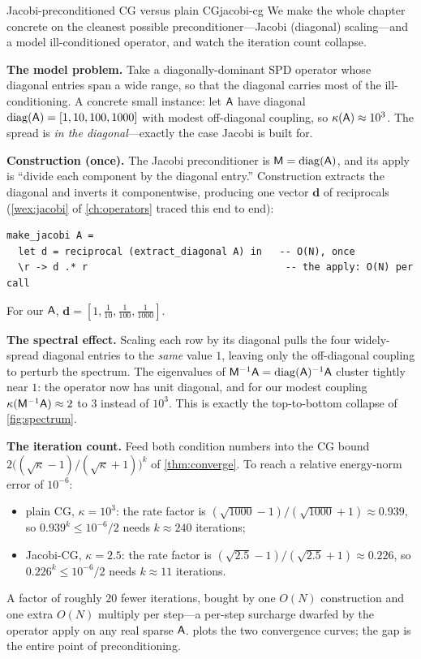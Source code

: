 \begin{workedexample}{Jacobi-preconditioned CG versus plain CG}{jacobi-cg}
We make the whole chapter concrete on the cleanest possible preconditioner---Jacobi
(diagonal) scaling---and a model ill-conditioned operator, and watch the iteration count
collapse.

\textbf{The model problem.} Take a diagonally-dominant SPD operator whose diagonal entries
span a wide range, so that the diagonal carries most of the ill-conditioning. A concrete
small instance: let $\mathsf{A}$ have diagonal $\operatorname{diag}(\mathsf{A})=[1,10,100,1000]$
with modest off-diagonal coupling, so $\kappa(\mathsf{A})\approx 10^{3}$. The spread is
\emph{in the diagonal}---exactly the case Jacobi is built for.

\textbf{Construction (once).} The Jacobi preconditioner is $\mathsf{M}=\operatorname{diag}(\mathsf{A})$,
and its apply is ``divide each component by the diagonal entry.'' Construction extracts the
diagonal and inverts it componentwise, producing one vector $\mathbf{d}$ of reciprocals
(\cref{wex:jacobi} of \cref{ch:operators} traced this end to end):
\begin{lstlisting}[style=l4style]
make_jacobi A =
  let d = reciprocal (extract_diagonal A) in   -- O(N), once
  \r -> d .* r                                  -- the apply: O(N) per call
\end{lstlisting}
For our $\mathsf{A}$, $\mathbf{d}=[1,\tfrac1{10},\tfrac1{100},\tfrac1{1000}]$.

\textbf{The spectral effect.} Scaling each row by its diagonal pulls the four widely-spread
diagonal entries to the \emph{same} value $1$, leaving only the off-diagonal coupling to
perturb the spectrum. The eigenvalues of $\mathsf{M}^{-1}\mathsf{A}=\operatorname{diag}(\mathsf{A})^{-1}\mathsf{A}$
cluster tightly near $1$: the operator now has unit diagonal, and for our modest coupling
$\kappa(\mathsf{M}^{-1}\mathsf{A})\approx 2$ to $3$ instead of $10^3$. This is exactly the
top-to-bottom collapse of \cref{fig:spectrum}.

\textbf{The iteration count.} Feed both condition numbers into the CG bound
$2\big((\sqrt\kappa-1)/(\sqrt\kappa+1)\big)^k$ of \cref{thm:converge}. To reach a relative
energy-norm error of $10^{-6}$:
\begin{itemize}[nosep]
  \item plain CG, $\kappa=10^{3}$: the rate factor is $(\sqrt{1000}-1)/(\sqrt{1000}+1)\approx
  0.939$, so $0.939^k\le 10^{-6}/2$ needs $k\approx 240$ iterations;
  \item Jacobi-CG, $\kappa=2.5$: the rate factor is $(\sqrt{2.5}-1)/(\sqrt{2.5}+1)\approx
  0.226$, so $0.226^k\le 10^{-6}/2$ needs $k\approx 11$ iterations.
\end{itemize}
A factor of roughly $20$ fewer iterations, bought by one $O(N)$ construction and one extra
$O(N)$ multiply per step---a per-step surcharge dwarfed by the operator apply on any real
sparse $\mathsf{A}$.  plots the two convergence curves; the gap is the
entire point of preconditioning.
\end{workedexample}

